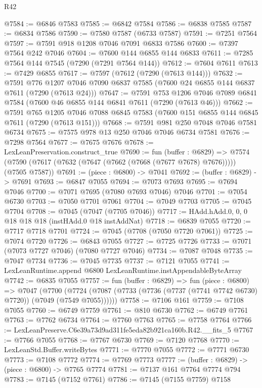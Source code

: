 \begin{lexlean}{R42}
\begin{coremodule}
{@7584 := @6846 @7583
@7585 := @6842 @7584
@7586 := @6838 @7585
@7587 := @6834 @7586
@7590 := @7580 @7587 (@6733 @7587)
@7591 := @7251 @7564
@7597 := @7591 @918 @1208 @7046 @7091 @6833 @7586
@7600 := @7397 @7564 @242 @7046
@7604 := @7600 @144 @6855 @144 @6833
@7611 := @7285 @7564 @144 @7545 (@7290 (@7291 @7564 @144))
@7612 := @7604 @7611
@7613 := @7429 @6855
@7617 := @7597 (@7612 (@7290 (@7613 @144)))
@7632 := @7591
    @776
    @1207
    @7046
    @7090
    @6837
    @7585
    (@7600 @24 @6855 @144 @6837 @7611 (@7290 (@7613 @24)))
@7647 := @7591
    @753
    @1206
    @7046
    @7089
    @6841
    @7584
    (@7600 @46 @6855 @144 @6841 @7611 (@7290 (@7613 @46)))
@7662 := @7591
    @765
    @1205
    @7046
    @7088
    @6845
    @7583
    (@7600 @151 @6855 @144 @6845 @7611 (@7290 (@7613 @151)))
@7668 := @7591 @981 @250 @7048 @7046 @7581 @6734
@7675 := @7575 @978 @13 @250 @7046 @7046 @6734 @7581
@7676 := @7298 @7564
@7677 := @7675 @7676
@7678 := LexLeanPreservation.construct_true
@7690 := fun (buffer : @6829) =>
  @7574 (@7590 (@7617 (@7632 (@7647 (@7662 (@7668 (@7677 @7678) @7676))))) (@7505 @7587))
@7691 := (piece : @6800) -> @7041
@7692 := (buffer : @6829) -> @7691
@7693 := @6847 @7055
@7694 := @7073 @7693
@7695 := @7694 @7046
@7700 := @7071 @7695 (@7080 @7693 @7046) @7046
@7701 := @7054 @6730
@7703 := @7050 @7701 @7061
@7704 := @7049 @7703
@7705 := @7045 @7704
@7708 := @7045 (@7047 (@7705 @7046))
@7717 := HAdd.hAdd.{0, 0, 0} @18 @18 @18 (instHAdd.{0} @18 instAddNat)
@7718 := @6839 @7055
@7720 := @7717 @7718 @7701
@7724 := @7045 (@7708 (@7050 @7720 @7061))
@7725 := @7074 @7720
@7726 := @6843 @7055
@7727 := @7725 @7726
@7733 := @7071 (@7073 @7727 @7046) (@7080 @7727 @7046)
@7734 := @7087 @7048
@7735 := @7047 @7734
@7736 := @7045 @7735
@7737 := @7121 @7055
@7741 := LexLeanRuntime.append @6800 LexLeanRuntime.instAppendableByteArray
@7742 := @6835 @7055
@7757 := fun (buffer : @6829) =>
  fun (piece : @6800) =>
  @7047
    (@7700 (@7724 (@7087 (@7733 (@7736 (@7737 (@7741 @7742 @6730) @7720)) (@7049 (@7549 @7055))))))
@7758 := @7106 @161
@7759 := @7108 @7055
@7760 := @6749 @7759
@7761 := @810 @6730
@7762 := @6749 @7761
@7763 := @7762 @6734
@7764 := @7760 @7763
@7765 := @7758 @7764
@7766 := LexLeanPreserve.C6e39a73d9ad311fe5eda82b921ca160b.R42.__fits_5
@7767 := @7766 @7055
@7768 := @7767 @6730
@7769 := @7120 @7768
@7770 := LexLeanStd.Buffer.writeBytes
@7771 := @7770 @7055
@7772 := @7771 @6730
@7773 := @7108 @7772
@7774 := @7769 @7773
@7777 := (buffer : @6829) -> (piece : @6800) -> @7765 @7774
@7781 := @7137 @161 @7764 @7774 @794
@7783 := @7145 (@7152 @7761)
@7786 := @7145 (@7155 @7759) @7158
}
\end{coremodule}
\end{lexlean}
